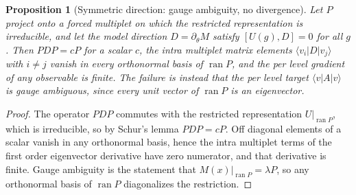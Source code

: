 \documentclass[11pt]{article}
\newtheorem{prop}{Proposition}
\newcommand{\comm}[2]{[#1,#2]}
\begin{document}
\begin{prop}[Symmetric direction: gauge ambiguity, no divergence]
\label{prop:sym}
Let $P$ project onto a forced multiplet on which the restricted representation
is irreducible, and let the model direction $D=\partial_\theta M$ satisfy
$\comm{U(g)}{D}=0$ for all $g$. Then $PDP=cP$ for a scalar $c$, the intra
multiplet matrix elements $\langle v_i|D|v_j\rangle$ with $i\ne j$ vanish in
every orthonormal basis of $\operatorname{ran}P$, and the per level gradient of
any observable is finite. The failure is instead that the per level target
$\langle v|A|v\rangle$ is gauge ambiguous, since every unit vector of
$\operatorname{ran}P$ is an eigenvector.
\end{prop}
\begin{proof}
The operator $PDP$ commutes with the restricted representation
$U|_{\operatorname{ran}P}$, which is irreducible, so by Schur's lemma $PDP=cP$.
Off diagonal elements of a scalar vanish in any orthonormal basis, hence the
intra multiplet terms of the first order eigenvector derivative have zero
numerator, and that derivative is finite. Gauge ambiguity is the statement that
$M(x)|_{\operatorname{ran}P}=\lambda P$, so any orthonormal basis of
$\operatorname{ran}P$ diagonalizes the restriction.
\end{proof}
\end{document}
